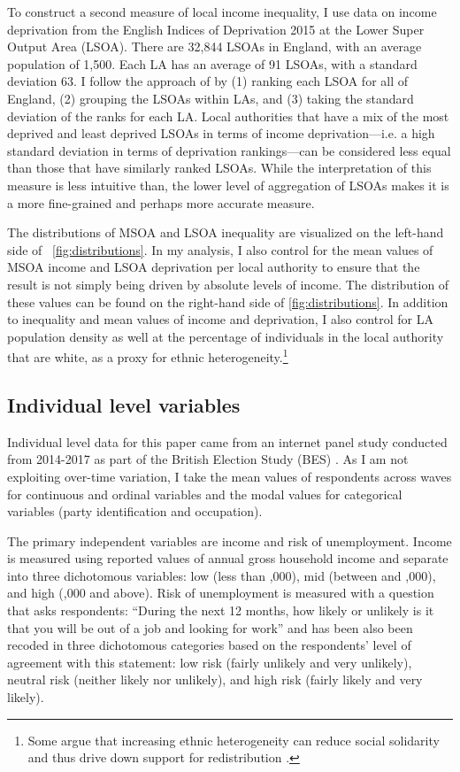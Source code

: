 \documentclass[12pt, letter]{scrartcl}
\begin{document}
To construct a second measure of local income inequality, I use data on income deprivation from the English Indices of Deprivation 2015 \parencite{deprivation2015} at the Lower Super Output Area (LSOA). There are 32,844 LSOAs in England, with an average population of 1,500. Each LA has an average of 91 LSOAs, with a standard deviation 63. I follow the approach of \textcite{bradshaw2015which} by (1) ranking each LSOA for all of England, (2) grouping the LSOAs within LAs, and (3) taking the standard deviation of the ranks for each LA. Local authorities that have a mix of the most deprived and least deprived LSOAs in terms of income deprivation---i.e. a high standard deviation in terms of deprivation rankings---can be considered less equal than those that have similarly ranked LSOAs. While the interpretation of this measure is less intuitive than, the lower level of aggregation of LSOAs makes it is a more fine-grained and perhaps more accurate measure.

The distributions of MSOA and LSOA inequality are visualized on the left-hand side of ~\ref{fig:distributions}. In my analysis, I also control for the mean values of MSOA income and LSOA deprivation per local authority to ensure that the result is not simply being driven by absolute levels of income. The distribution of these values can be found on the right-hand side of \ref{fig:distributions}. In addition to inequality and mean values of income and deprivation, I also control for LA population density as well at the percentage of individuals in the local authority that are white, as a proxy for ethnic heterogeneity.\footnote{Some argue that increasing ethnic heterogeneity can reduce social solidarity and thus drive down support for redistribution \parencite{alesina2004fighting, garand2017immigration}.} 

\subsection{Individual level variables}

Individual level data for this paper came from an internet panel study conducted from 2014-2017 as part of the British Election Study (BES) \parencite{bespanel}. As I am not exploiting over-time variation, I take the mean values of respondents across waves for continuous and ordinal variables and the modal values for categorical variables (party identification and occupation). 

The primary independent variables are income and risk of unemployment. Income is measured using reported values of annual gross household income and separate into three dichotomous variables: low (less than ,000), mid (between  and ,000), and high (,000 and above). Risk of unemployment is measured with a question that asks respondents: ``During the next 12 months, how likely or unlikely is it that you will be out of a job and looking for work'' and has been also been recoded in three dichotomous categories based on the respondents' level of agreement with this statement: low risk (fairly unlikely and very unlikely), neutral risk (neither likely nor unlikely), and high risk (fairly likely and very likely). 
\end{document}
